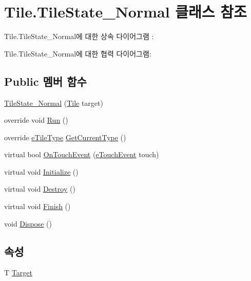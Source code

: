 \hypertarget{class_tile_1_1_tile_state___normal}{}\section{Tile.\+Tile\+State\+\_\+\+Normal 클래스 참조}
\label{class_tile_1_1_tile_state___normal}


Tile.\+Tile\+State\+\_\+\+Normal에 대한 상속 다이어그램 \+: 


Tile.\+Tile\+State\+\_\+\+Normal에 대한 협력 다이어그램\+:
\subsection*{Public 멤버 함수}
\begin{DoxyCompactItemize}
\item 
\hyperlink{class_tile_1_1_tile_state___normal_a521cdb030b6ad4b3827cd37592a79406}{Tile\+State\+\_\+\+Normal} (\hyperlink{class_tile}{Tile} target)
\item 
override void \hyperlink{class_tile_1_1_tile_state___normal_acf613382b6ddeff2fcc226d8caeb0b53}{Run} ()
\item 
override \hyperlink{_tile_8cs_a271bc07be325bca511bcb747e0ff2fda}{e\+Tile\+Type} \hyperlink{class_tile_1_1_tile_state___normal_ad649955a61ea5ca2158b3c379ea8c505}{Get\+Current\+Type} ()
\item 
virtual bool \hyperlink{class_tile_1_1_tile_state_a8687f7cb0e2c1a436c5ac395f4f6d07a}{On\+Touch\+Event} (\hyperlink{_touch_manager_8cs_ae33e321a424fe84ba8b2fdb81ad40a68}{e\+Touch\+Event} touch)
\item 
virtual void \hyperlink{class_f_z_1_1_state_a27ac6fd2e844476017b35aa781d73c8c}{Initialize} ()
\item 
virtual void \hyperlink{class_f_z_1_1_state_aa85fdf4a5495d6d5d3ed4aeda3497c8a}{Destroy} ()
\item 
virtual void \hyperlink{class_f_z_1_1_state_a288bb8c3fceee4bf03f01e295dcef1be}{Finish} ()
\item 
void \hyperlink{class_f_z_1_1_state_a598887d3fbb412fada132dc1c079b25b}{Dispose} ()
\end{DoxyCompactItemize}
\subsection*{속성}
\begin{DoxyCompactItemize}
\item 
T \hyperlink{class_f_z_1_1_state_a6927f5c9f2517052f9dc5596188e9d95}{Target}
\end{DoxyCompactItemize}
